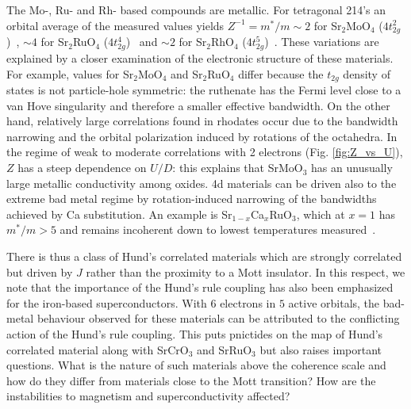 \documentclass[aps,prl,amsmath, amssymb, english, aps, prl, onecolumn,
  reprint,floatfix, superscriptaddress]{revtex4-1}
\begin{document}
The Mo-, Ru- and Rh- based compounds are metallic.  For tetragonal
214's an orbital average of the measured values yields
$Z^{-1}=m^*/m\sim 2$ for Sr$_2$MoO$_4$
($4t_{2g}^2$)~\cite{ikeda_Sr2MoO4_jpsj_2000}, $\sim 4$ for
Sr$_2$RuO$_4$ ($4t_{2g}^4$)~\cite{imada_mit_review} and $\sim 2$ for
Sr$_2$RhO$_4$ ($4t_{2g}^5$)~\cite{perry_Sr2RhO4_njp_2006}.  These
variations  are explained by a closer examination of the electronic structure of these
materials. For example, values for Sr$_2$MoO$_4$ and Sr$_2$RuO$_4$
differ because the $t_{2g}$ density of states is not particle-hole
symmetric: the ruthenate has the Fermi level close to a van Hove
singularity and therefore a smaller effective
bandwidth\cite{mravlje11}.  On the other hand, relatively large
correlations found in rhodates occur due to the bandwidth narrowing
and the orbital polarization induced by rotations of the octahedra.
In the regime of weak to moderate correlations with 2 electrons
(Fig. \ref{fig:Z_vs_U}), $Z$ has a steep dependence on $U/D$: this
explains that SrMoO$_3$ has an unusually large metallic conductivity
among oxides\cite{nagai05}.  4d materials can be driven also to the
extreme bad metal regime by rotation-induced narrowing of the
bandwidths achieved by Ca substitution.  An example is Sr$_{1-x}$Ca$_x$RuO$_3$,
which at $x=1$ has $m^*/m>5$ and remains incoherent down to lowest temperatures
measured~\cite{cao97}.



There is thus a class of Hund's correlated materials which are
strongly correlated but driven by $J$ rather than the proximity to a
Mott insulator.  In this respect, we note that the importance of the
Hund's rule coupling has also been emphasized for the iron-based
superconductors\cite{haule09,mazin_Hund_pnictides,aichhorn10}.  With
$6$ electrons in $5$ active orbitals, the bad-metal behaviour observed
for these materials can be attributed to the conflicting action of the
Hund's rule coupling.  This puts pnictides on the map of Hund's
correlated material along with SrCrO$_3$ and SrRuO$_3$ but also raises
important questions. What is the nature of such materials above the
coherence scale and how do they differ from materials close to the
Mott transition?  How are the instabilities to magnetism and
superconductivity affected?
 
\end{document}
